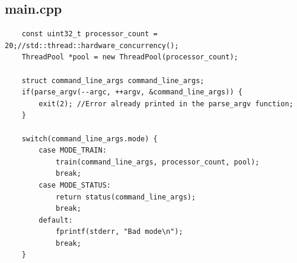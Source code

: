 \documentclass{article}
\begin{document}
\subsection{main.cpp}
\label{appendix:main}
\begin{verbatim}
    const uint32_t processor_count = 20;//std::thread::hardware_concurrency();
    ThreadPool *pool = new ThreadPool(processor_count);
    
    struct command_line_args command_line_args;
    if(parse_argv(--argc, ++argv, &command_line_args)) {
        exit(2); //Error already printed in the parse_argv function;
    }
    
    switch(command_line_args.mode) {
        case MODE_TRAIN:
            train(command_line_args, processor_count, pool);
            break;
        case MODE_STATUS:
            return status(command_line_args);
            break;
        default:
            fprintf(stderr, "Bad mode\n");
            break;
    }
    \end{verbatim}
\end{document}
